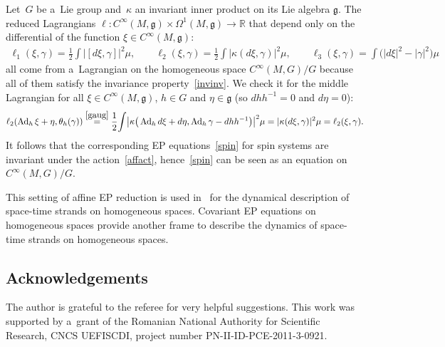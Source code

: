\documentclass[10pt,a4paper]{amsart}
\numberwithin{equation}{section}
\begin{document}
\begin{Example}
Let~$G$ be a~Lie group and~$\kappa$ an invariant inner product on its Lie algebra $\mathfrak g$.
The reduced Lagrangians $\ell:C^{\infty}(M,\mathfrak g)\times\Omega^1(M,\mathfrak g)\to\mathbb R$ that depend only on
the dif\/ferential of the function $\xi\in C^{\infty}(M,\mathfrak g)$:
\begin{gather*}
\ell_1(\xi,\gamma)=\frac12\int|[d\xi,\gamma]|^2\mu,
\qquad
\ell_2(\xi,\gamma)=\frac12\int|\kappa(d\xi,\gamma)|^2\mu,
\qquad
\ell_3(\xi,\gamma)=\int\big(|d\xi|^2-|\gamma|^2\big)\mu
\end{gather*}
all come from a~Lagrangian on the homogeneous space $C^{\infty}(M,G)/G$ because all of them satisfy the invariance
property~\eqref{invinv}.
We check it for the middle Lagrangian for all $\xi\in C^{\infty}(M,\mathfrak g)$, $h\in G$ and $\eta\in\mathfrak g$ (so
$dhh^{-1}=0$ and $d\eta=0$):
\begin{gather*}
\ell_2(\operatorname{Ad}_h\xi+\eta,\theta_h(\gamma))
\stackrel{\eqref{gaug}}{=}
\frac12\!\int\!\big|\kappa\big(\operatorname{Ad}_hd\xi+d\eta,\operatorname{Ad}_h\gamma-dhh^{-1}\big)\big|^2\mu
=|\kappa(d\xi,\gamma)|^2\mu=\ell_2(\xi,\gamma).
\end{gather*}
It follows that the corresponding EP equations~\eqref{spin} for spin systems are invariant under the
action~\eqref{affact}, hence~\eqref{spin} can be seen as an equation on $C^{\infty}(M,G)/G$.

This setting of af\/f\/ine EP reduction is used in~\cite{V} for the dynamical description of space-time strands on
homogeneous spaces.
Covariant EP equations on homogeneous spaces provide another frame to describe the dynamics of space-time strands on
homogeneous spaces.
\end{Example}

\subsection*{Acknowledgements}

The author is grateful to the referee for very helpful suggestions.
This work was supported by a~grant of the Romanian National Authority for Scientif\/ic Research, CNCS UEFISCDI, project
number PN-II-ID-PCE-2011-3-0921.

\vspace{-1mm}

\end{document}
